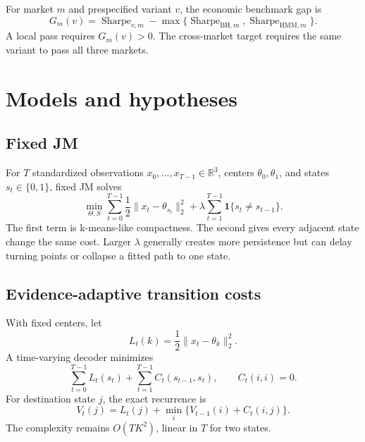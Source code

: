 \documentclass[11pt]{article}
\newcommand{\ind}{\mathbf{1}}
\begin{document}
For market \(m\) and prespecified variant \(v\), the economic benchmark gap is
\begin{equation}
G_m(v)=\operatorname{Sharpe}_{v,m}
-\max\{\operatorname{Sharpe}_{\mathrm{BH},m},
       \operatorname{Sharpe}_{\mathrm{HMM},m}\}.
\label{eq:gap}
\end{equation}
A local pass requires \(G_m(v)>0\). The cross-market target requires the same
variant to pass all three markets.

\section{Models and hypotheses}

\subsection{Fixed JM}

For \(T\) standardized observations \(x_0,\ldots,x_{T-1}\in\mathbb{R}^3\),
centers \(\theta_0,\theta_1\), and states \(s_t\in\{0,1\}\), fixed JM solves
\begin{equation}
\min_{\Theta,S}
\sum_{t=0}^{T-1}\frac12\|x_t-\theta_{s_t}\|_2^2
+\lambda\sum_{t=1}^{T-1}\ind\{s_t\ne s_{t-1}\}.
\label{eq:fixed}
\end{equation}
The first term is k-means-like compactness. The second gives every adjacent
state change the same cost. Larger \(\lambda\) generally creates more
persistence but can delay turning points or collapse a fitted path to one
state.

\subsection{Evidence-adaptive transition costs}

With fixed centers, let
\begin{equation}
L_t(k)=\frac12\|x_t-\theta_k\|_2^2.
\label{eq:loss}
\end{equation}
A time-varying decoder minimizes
\begin{equation}
\sum_{t=0}^{T-1}L_t(s_t)
+\sum_{t=1}^{T-1}C_t(s_{t-1},s_t),
\qquad C_t(i,i)=0.
\label{eq:tvobjective}
\end{equation}
For destination state \(j\), the exact recurrence is
\begin{equation}
V_t(j)=L_t(j)+\min_i\{V_{t-1}(i)+C_t(i,j)\}.
\label{eq:dp}
\end{equation}
The complexity remains \(O(TK^2)\), linear in \(T\) for two states.
\end{document}
